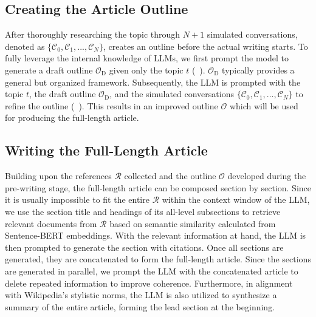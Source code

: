 \subsection{Creating the Article Outline}
\label{sec:method_outline}
After thoroughly researching the topic through $N+1$ simulated conversations, denoted as $\{\mathcal{C}_0, \mathcal{C}_1,..., \mathcal{C}_N\}$, \system creates an outline before the actual writing starts. To fully leverage the internal knowledge of LLMs, we first prompt the model to generate a draft outline $\mathcal{O}_\text{D}$ given only the topic $t$ (~). $\mathcal{O}_\text{D}$ typically provides a general but organized framework. Subsequently, the LLM is prompted with the topic $t$,  the draft outline $\mathcal{O}_\text{D}$, and the simulated conversations $\{\mathcal{C}_0, \mathcal{C}_1,..., \mathcal{C}_N\}$ to refine the outline (~). This results in an improved outline $\mathcal{O}$ which will be used for producing the full-length article.

\subsection{Writing the Full-Length Article}
\label{sec:method_article}

Building upon the references $\mathcal{R}$ collected and the outline $\mathcal{O}$ developed during the pre-writing stage, the full-length article can be composed section by section. Since it is usually impossible to fit the entire $\mathcal{R}$ within the context window of the LLM, we use the section title and headings of its all-level subsections to retrieve relevant documents from $\mathcal{R}$ based on semantic similarity calculated from Sentence-BERT embeddings. With the relevant information at hand, the LLM is then prompted to generate the section with citations. Once all sections are generated, %
they are concatenated to form the full-length article. %
Since the sections are generated in parallel, we prompt the LLM with the concatenated article to delete repeated information to improve coherence. Furthermore, in alignment with Wikipedia's stylistic norms, the LLM is also utilized to synthesize a summary of the entire article, forming the lead section at the beginning.

